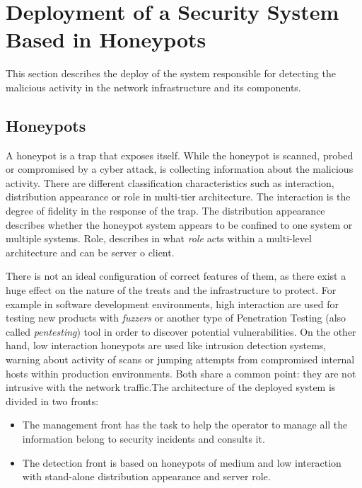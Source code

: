 \documentclass[a4paper]{llncs}
\begin{document}
\section{Deployment of a Security System Based in Honeypots}
\label{sec:deployment}
This section describes the deploy of the system responsible for detecting the malicious activity in the network infrastructure and its components.

\subsection{Honeypots}
A honeypot is a trap that exposes itself. While the honeypot is scanned, probed or compromised by a cyber attack, is collecting information about the malicious activity. There are different classification characteristics such as interaction, distribution appearance or role in multi-tier architecture\cite{Seifert06taxonomyof}. The interaction is the degree of fidelity in the response of the trap. The distribution appearance describes whether the honeypot system appears to be confined to one system or multiple systems. Role, describes in what {\it role} acts within a multi-level architecture and can be server o client.

There is not an ideal configuration of correct features of them, as there exist a huge effect on the nature of the treats and the infrastructure to protect. For example in software development environments, high interaction are used for testing new products with {\it fuzzers} or another type of Penetration Testing (also called {\it pentesting}) tool \cite{fuzzingforsec} in order to discover potential vulnerabilities. On the other hand, low interaction honeypots are used like intrusion detection systems, warning about activity of scans or jumping attempts from compromised internal hosts within production environments. Both share a common point: they are not intrusive with the network traffic.The architecture of the deployed system is divided in two fronts:
\begin{itemize}
	\item The management front has the task to help the operator to manage all the information belong to security incidents and consults it.
	\item The detection front is based on honeypots of medium and low interaction with stand-alone distribution appearance and server role.
\end{itemize}
\end{document}
